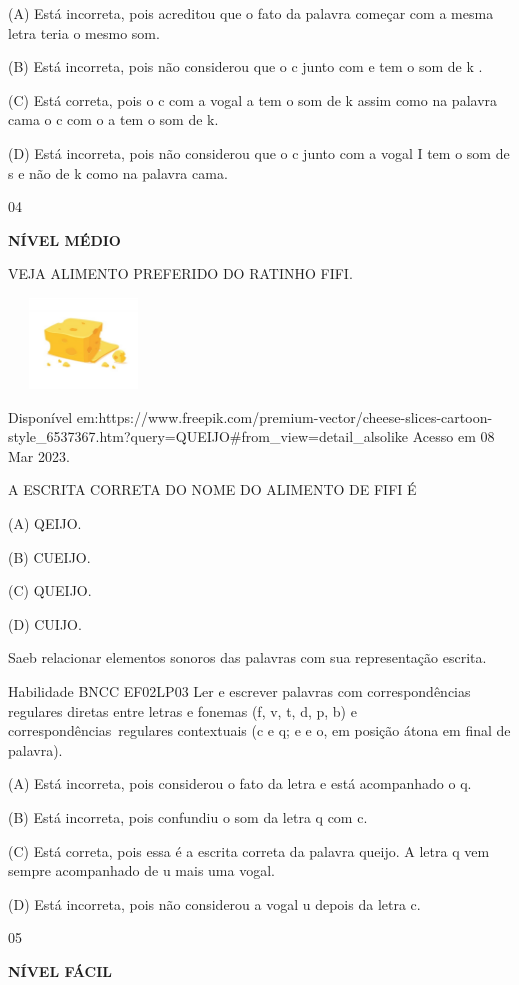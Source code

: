 {{(A) Está incorreta, pois acreditou que o fato da palavra começar com a
mesma letra teria o mesmo som.

(B) Está incorreta, pois não considerou que o c junto com e tem o som de
k .

(C) Está correta, pois o c com a vogal a tem o som de k assim como na
palavra cama o c com o a tem o som de k.

(D) Está incorreta, pois não considerou que o c junto com a vogal I tem
o som de s e não de k como na palavra cama.

\num{04}

\textbf{NÍVEL MÉDIO}

VEJA ALIMENTO PREFERIDO DO RATINHO FIFI.

\includegraphics[width=1.56736in,height=0.94861in]{media/image141.jpeg}

Disponível
em:https://www.freepik.com/premium-vector/cheese-slices-cartoon-style\_6537367.htm?query=QUEIJO\#from\_view=detail\_alsolike
Acesso em 08 Mar 2023.

A ESCRITA CORRETA DO NOME DO ALIMENTO DE FIFI É

(A) QEIJO.

(B) CUEIJO.

(C) QUEIJO.

(D) CUIJO.

Saeb relacionar elementos sonoros das palavras com sua representação
escrita.

Habilidade BNCC EF02LP03 Ler e escrever palavras com correspondências
regulares diretas entre letras e fonemas (f, v, t, d, p, b) e
correspondências~regulares contextuais (c e q; e e o, em posição átona
em final de palavra).

(A) Está incorreta, pois considerou o fato da letra e está acompanhado o
q.

(B) Está incorreta, pois confundiu o som da letra q com c.

(C) Está correta, pois essa é a escrita correta da palavra queijo. A
letra q vem sempre acompanhado de u mais uma vogal.

(D) Está incorreta, pois não considerou a vogal u depois da letra c.

\num{05}

\textbf{NÍVEL FÁCIL}

}}
